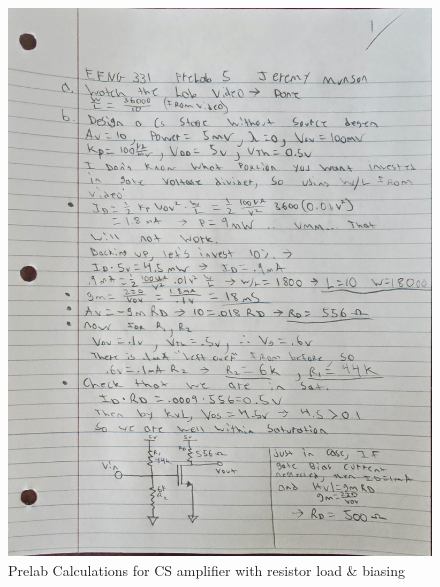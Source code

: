 \documentclass[11pt]{article}
\begin{document}
	\begin{figure}
		\centering
		\includegraphics[width=0.95\linewidth]{prelab1}
		\caption{Prelab Calculations for CS amplifier with resistor load \& biasing}
		\label{fig:prelab1}
	\end{figure}
\end{document}
